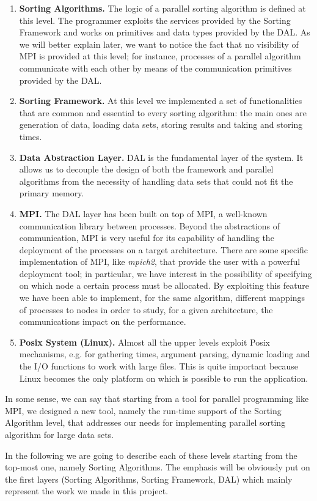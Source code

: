 \begin{enumerate}
\item \textbf{Sorting Algorithms.} The logic of a parallel sorting algorithm is defined at this level. The programmer exploits the services provided by the Sorting Framework and works on primitives and data types provided by the DAL. As we will better explain later, we want to notice the fact that no visibility of MPI is provided at this level; for instance, processes of a parallel algorithm communicate with each other by means of the communication primitives provided by the DAL.  
\item \textbf{Sorting Framework.} At this level we implemented a set of functionalities that are common and essential to every sorting algorithm: the main ones are generation of data, loading data sets, storing results and taking and storing times.
\item \textbf{Data Abstraction Layer.} DAL is the fundamental layer of the system. It allows us to decouple the design of both the framework and parallel algorithms from the necessity of handling data sets that could not fit the primary memory. 
\item \textbf{MPI.} The DAL layer has been built on top of MPI, a well-known communication library between processes. Beyond the abstractions of communication, MPI is very useful for its capability of handling the deployment of the processes on a target architecture. There are some specific implementation of MPI, like \textit{mpich2}, that provide the user with a powerful deployment tool; in particular, we have interest in the possibility of specifying on which node a certain process must be allocated. By exploiting this feature we have been able to implement, for the same algorithm, different mappings of processes to nodes in order to study, for a given architecture, the communications impact on the performance. 
\item \textbf{Posix System (Linux).} Almost all the upper levels exploit Posix mechanisms, e.g. for gathering times, argument parsing, dynamic loading and the I/O functions to work with large files. This is quite important because Linux becomes the only platform on which is possible to run the application. 
\end{enumerate}
In some sense, we can say that starting from a tool for parallel programming like MPI, we designed a new tool, namely the run-time support of the Sorting Algorithm level, that addresses our needs for implementing parallel sorting algorithm for large data sets. 

In the following we are going to describe each of these levels starting from the top-most one, namely Sorting Algorithms. The emphasis will be obviously put on the first layers (Sorting Algorithms, Sorting Framework, DAL) which mainly represent the work we made in this project.

